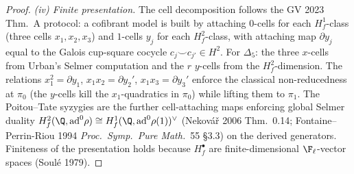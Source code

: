 \begin{proof}
\emph{(iv) Finite presentation.} The cell decomposition follows the
GV 2023 Thm.~A protocol: a cofibrant model is built by attaching
$0$-cells for each $H^1_f$-class (three cells $x_1,x_2,x_3$) and
$1$-cells $y_j$ for each $H^2_f$-class, with attaching map
$\partial y_j$ equal to the Galois cup-square cocycle
$c_j\smile c_{j'}\in H^2$. For $\Delta_5$: the three $x$-cells from
Urban's Selmer computation and the $r$ $y$-cells from the
$H^2_f$-dimension. The relations
$x_1^2=\partial y_1$, $x_1 x_2=\partial y_2'$, $x_1 x_3=\partial y_3'$
enforce the classical non-reducedness at $\pi_0$ (the
$y$-cells kill the $x_1$-quadratics in $\pi_0$) while lifting them to
$\pi_1$. The Poitou--Tate syzygies are the further cell-attaching
maps enforcing global Selmer duality
$H^2_f(\Q,\mathrm{ad}^0\rho)\cong
H^1_f(\Q,\mathrm{ad}^0\rho(1))^\vee$
(Nekov\'a\v{r} 2006 Thm.~0.14; Fontaine--Perrin-Riou 1994
\emph{Proc.\ Symp.\ Pure Math.}\ 55 \S 3.3) on the derived generators.
Finiteness of the presentation holds because $H^{\bullet}_f$ are
finite-dimensional $\F_\ell$-vector spaces (Soul\'e 1979).
\qedhere
\end{proof}

